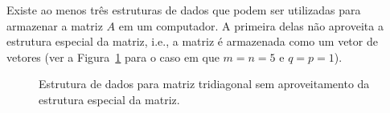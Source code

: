 \documentclass[12pt,a4paper]{article}
\begin{document}
Existe ao menos tr\^{e}s estruturas de dados que podem ser utilizadas para armazenar a matriz $A$ em um computador. A primeira delas n\~{a}o aproveita a estrutura especial da matriz, i.e., a matriz \'{e} armazenada como um vetor de vetores (ver a Figura~\ref{fig:est_dados_matriz} para o caso em que $m = n = 5$ e $q = p = 1$).
\begin{figure}[!htb]
    \centering
    \caption{Estrutura de dados para matriz tridiagonal sem aproveitamento da estrutura especial da matriz.}
    \label{fig:est_dados_matriz}
\end{figure}
\end{document}
